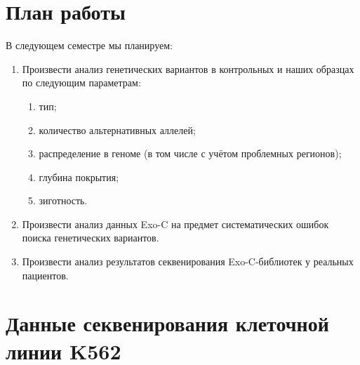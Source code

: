 \documentclass[a4paper,12pt]{article}
\begin{document}
\section{План работы}

В следующем семестре мы планируем:

\begin{enumerate}
\item Произвести анализ генетических вариантов в контрольных и наших образцах по следующим параметрам:
\begin{enumerate}
\item тип;
\item количество альтернативных аллелей;
 \item распределение в геноме (в том числе с учётом проблемных регионов);
 \item глубина покрытия;
 \item зиготность.
\end{enumerate}

\item Произвести анализ данных Exo-C на предмет систематических ошибок поиска генетических вариантов.

\item Произвести анализ результатов секвенирования Exo-C-библиотек у реальных пациентов.

\end{enumerate}

\newpage

\appendix

\section{Данные секвенирования клеточной линии K562}
\end{document}
